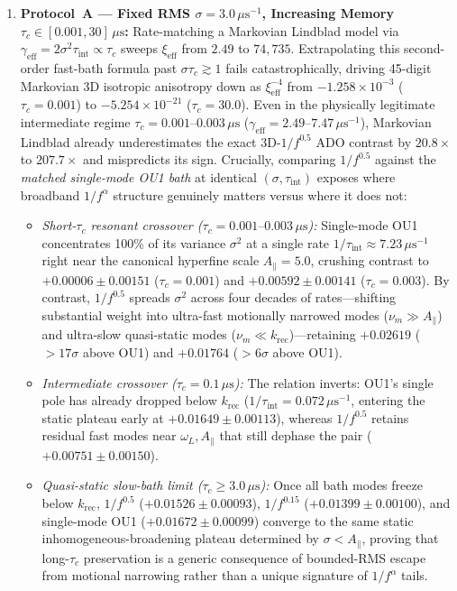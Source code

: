 \documentclass[twocolumn,10pt,amsmath,amssymb,floatfix]{revtex4-2}
\theoremstyle{plain}
\theoremstyle{definition}
\begin{document}
\begin{enumerate}[leftmargin=1.4em,itemsep=2pt]
\item \textbf{Protocol~A --- Fixed RMS $\sigma = 3.0\,\mu\text{s}^{-1}$, Increasing Memory $\tau_c \in [0.001, 30]\,\mu\text{s}$:} Rate-matching a Markovian Lindblad model via $\gamma_{\mathrm{eff}} = 2\sigma^2\tau_{\mathrm{int}} \propto \tau_c$ sweeps $\xi_{\mathrm{eff}}$ from $2.49$ to $74{,}735$. Extrapolating this second-order fast-bath formula past $\sigma\tau_c \gtrsim 1$ fails catastrophically, driving 45-digit Markovian 3D isotropic anisotropy down as $\xi_{\mathrm{eff}}^{-4}$ from $-1.258\times 10^{-3}$ ($\tau_c=0.001$) to $-5.254\times 10^{-21}$ ($\tau_c=30.0$). Even in the physically legitimate intermediate regime $\tau_c = 0.001\text{--}0.003\,\mu\text{s}$ ($\gamma_{\mathrm{eff}} = 2.49\text{--}7.47\,\mu\text{s}^{-1}$), Markovian Lindblad already underestimates the exact 3D-$1/f^{0.5}$ ADO contrast by $20.8\times$ to $207.7\times$ and mispredicts its sign. Crucially, comparing $1/f^{0.5}$ against the \emph{matched single-mode OU1 bath} at identical $(\sigma, \tau_{\mathrm{int}})$ exposes where broadband $1/f^\alpha$ structure genuinely matters versus where it does not:
  \begin{itemize}[leftmargin=1.2em,itemsep=1pt]
  \item \emph{Short-$\tau_c$ resonant crossover ($\tau_c = 0.001\text{--}0.003\,\mu\text{s}$):} Single-mode OU1 concentrates 100\% of its variance $\sigma^2$ at a single rate $1/\tau_{\mathrm{int}} \approx 7.23\,\mu\text{s}^{-1}$ right near the canonical hyperfine scale $A_\parallel = 5.0$, crushing contrast to $+0.00006 \pm 0.00151$ ($\tau_c=0.001$) and $+0.00592 \pm 0.00141$ ($\tau_c=0.003$). By contrast, $1/f^{0.5}$ spreads $\sigma^2$ across four decades of rates---shifting substantial weight into ultra-fast motionally narrowed modes ($\nu_m \gg A_\parallel$) and ultra-slow quasi-static modes ($\nu_m \ll k_{\mathrm{rec}}$)---retaining $+0.02619$ ($>17\sigma$ above OU1) and $+0.01764$ ($>6\sigma$ above OU1).
  \item \emph{Intermediate crossover ($\tau_c = 0.1\,\mu\text{s}$):} The relation inverts: OU1's single pole has already dropped below $k_{\mathrm{rec}}$ ($1/\tau_{\mathrm{int}} = 0.072\,\mu\text{s}^{-1}$, entering the static plateau early at $+0.01649 \pm 0.00113$), whereas $1/f^{0.5}$ retains residual fast modes near $\omega_L, A_\parallel$ that still dephase the pair ($+0.00751 \pm 0.00150$).
  \item \emph{Quasi-static slow-bath limit ($\tau_c \ge 3.0\,\mu\text{s}$):} Once all bath modes freeze below $k_{\mathrm{rec}}$, $1/f^{0.5}$ ($+0.01526 \pm 0.00093$), $1/f^{0.15}$ ($+0.01399 \pm 0.00100$), and single-mode OU1 ($+0.01672 \pm 0.00099$) converge to the same static inhomogeneous-broadening plateau determined by $\sigma < A_\parallel$, proving that long-$\tau_c$ preservation is a generic consequence of bounded-RMS escape from motional narrowing rather than a unique signature of $1/f^\alpha$ tails.

\end{itemize}
\end{enumerate}
\end{document}

